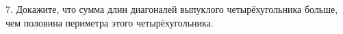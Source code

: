 7. Докажите, что сумма длин диагоналей выпуклого четырёхугольника больше, чем половина периметра этого четырёхугольника.\\
